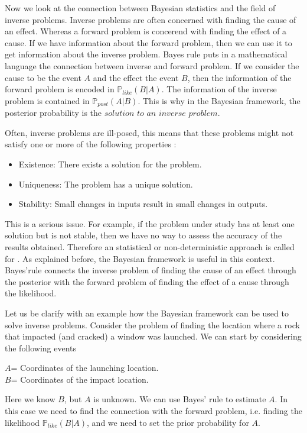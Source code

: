 \documentclass[12pt]{book}
\newcommand{\post}{\mathbb{P}_{post}}
\newcommand{\like}{\mathbb{P}_{like}}
\begin{document}
Now we look at the connection between Bayesian statistics and  the field of inverse problems. 
Inverse problems are  often concerned with finding the cause of an effect. Whereas a forward
problem is concerend with finding the effect of a cause. If we have information about the 
forward problem, then we can use it to get information about the inverse problem. Bayes rule
puts in a mathematical language the connection between inverse and forward problem. 
If we consider the cause to be the
event $A$ and the effect the event $B$, then the information of the forward problem
is encoded in $\like(B|A)$. The information of the inverse problem is contained in 
$\post(A|B)$. This is why in the Bayesian framework, the posterior probability
is the $\textit{solution to an inverse problem}$.

Often, inverse problems
are ill-posed, this means
that these problems might  not satisfy one or more of the following properties \cite{lebedev2012functional}:

\begin{itemize}
\item Existence: There exists a solution for the problem.
\item Uniqueness: The problem has a unique solution.
\item Stability: Small changes in inputs result in small changes in outputs.
\end{itemize}
This is a serious issue. For example, if the problem under study has at least one solution but  is not stable, 
then we have no way to assess the accuracy of the results obtained. 
Therefore an statistical or non-deterministic approach is called for . As explained before, the Bayesian framework 
is useful in this context. Bayes'rule connects the inverse problem  of finding the cause
of an effect through the posterior with the forward problem of finding the effect of a cause
through the likelihood.

Let us be clarify with an example how the Bayesian framework can be used to solve inverse problems. 
Consider the problem of finding the location where a rock that impacted (and cracked) a window was launched. 
We can start by considering the following events
\begin{center}
$A$= Coordinates of the launching location.\\
$B$= Coordinates of the impact location.
\end{center}
Here we know $B$, but $A$ is unknown. We can use Bayes' rule to estimate $A$. In this case
we need to find the connection with the forward problem, i.e. finding the likelihood $\like(B|A)$,
and we need to set the prior probability for $A$. 
\newline
\end{document}
